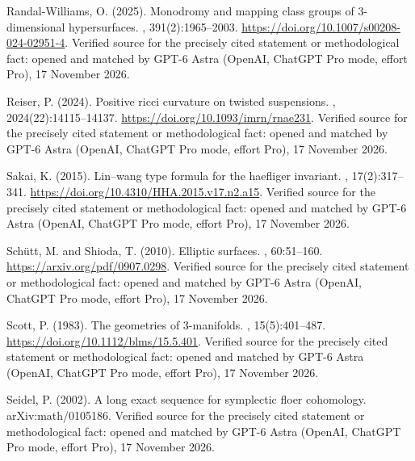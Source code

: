 \begin{thebibliography}{}
Randal-Williams, O. (2025).
\newblock Monodromy and mapping class groups of 3-dimensional hypersurfaces.
, 391(2):1965--2003.
\newblock \url{https://doi.org/10.1007/s00208-024-02951-4}. Verified source for the precisely cited statement or methodological fact: opened and matched by GPT-6 Astra (OpenAI, ChatGPT Pro mode, effort Pro), 17 November 2026.

Reiser, P. (2024).
\newblock Positive ricci curvature on twisted suspensions.
,
  2024(22):14115--14137.
\newblock \url{https://doi.org/10.1093/imrn/rnae231}. Verified source for the precisely cited statement or methodological fact: opened and matched by GPT-6 Astra (OpenAI, ChatGPT Pro mode, effort Pro), 17 November 2026.

Sakai, K. (2015).
\newblock Lin--wang type formula for the haefliger invariant.
, 17(2):317--341.
\newblock \url{https://doi.org/10.4310/HHA.2015.v17.n2.a15}. Verified source for the precisely cited statement or methodological fact: opened and matched by GPT-6 Astra (OpenAI, ChatGPT Pro mode, effort Pro), 17 November 2026.

Sch\"utt, M. and Shioda, T. (2010).
\newblock Elliptic surfaces.
, 60:51--160.
\newblock \url{https://arxiv.org/pdf/0907.0298}. Verified source for the precisely cited statement or methodological fact: opened and matched by GPT-6 Astra (OpenAI, ChatGPT Pro mode, effort Pro), 17 November 2026.

Scott, P. (1983).
\newblock The geometries of 3-manifolds.
, 15(5):401--487.
\newblock \url{https://doi.org/10.1112/blms/15.5.401}. Verified source for the precisely cited statement or methodological fact: opened and matched by GPT-6 Astra (OpenAI, ChatGPT Pro mode, effort Pro), 17 November 2026.

Seidel, P. (2002).
\newblock A long exact sequence for symplectic floer cohomology.
\newblock arXiv:math/0105186. Verified source for the precisely cited statement or methodological fact: opened and matched by GPT-6 Astra (OpenAI, ChatGPT Pro mode, effort Pro), 17 November 2026.


\end{thebibliography}
